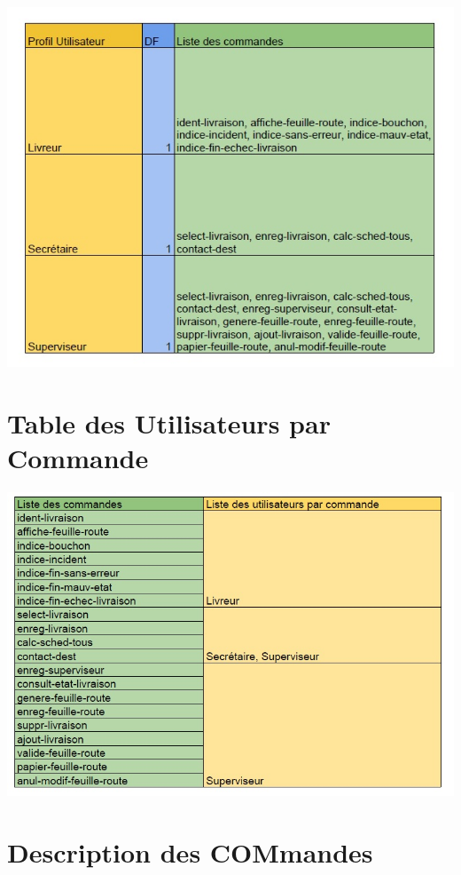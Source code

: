 \documentclass{report}
\begin{document}
\includegraphics[scale = 0.6]{images/TCU.jpg}

\section{Table des Utilisateurs par Commande}

\includegraphics[scale = 0.6]{images/TUC.jpg}

\section{Description des COMmandes}

\hypertarget{labDCOM}{}
\end{document}
